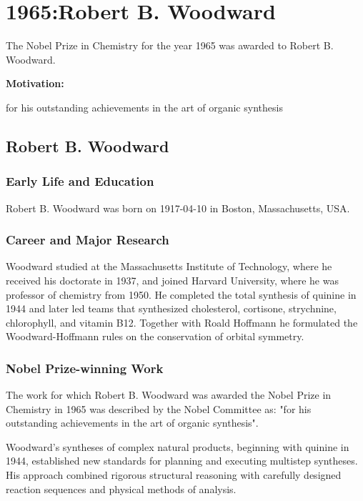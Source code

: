 \chapter{1965:Robert B. Woodward}

\label{chap:chemistry1965}

The Nobel Prize in Chemistry for the year 1965 was awarded to Robert B. Woodward.

\textbf{Motivation:}

for his outstanding achievements in the art of organic synthesis

\section{Robert B. Woodward}

\subsection*{Early Life and Education}

Robert B. Woodward was born on 1917-04-10 in Boston, Massachusetts, USA.

\subsection*{Career and Major Research}

Woodward studied at the Massachusetts Institute of Technology, where he received his doctorate in 1937, and joined Harvard University, where he was professor of chemistry from 1950. He completed the total synthesis of quinine in 1944 and later led teams that synthesized cholesterol, cortisone, strychnine, chlorophyll, and vitamin B12. Together with Roald Hoffmann he formulated the Woodward-Hoffmann rules on the conservation of orbital symmetry.

\subsection*{Nobel Prize-winning Work}

The work for which Robert B. Woodward was awarded the Nobel Prize in Chemistry in 1965 was described by the Nobel Committee as: "for his outstanding achievements in the art of organic synthesis".

Woodward's syntheses of complex natural products, beginning with quinine in 1944, established new standards for planning and executing multistep syntheses. His approach combined rigorous structural reasoning with carefully designed reaction sequences and physical methods of analysis.

